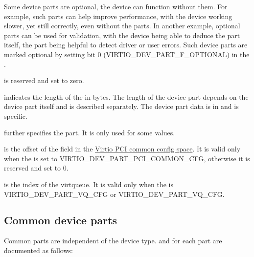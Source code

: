 Some device parts are optional, the device can function without them.
For example, such parts can help improve performance, with the device working
slower, yet still correctly, even without the parts. In another example,
optional parts can be used for validation, with the device being able to deduce
the part itself, the part being helpful to detect driver or user errors.
Such device parts are marked optional by setting bit 0
(VIRTIO_DEV_PART_F_OPTIONAL) in the .

 is reserved and set to zero.

 indicates the length of the  in bytes. The length
of the device part depends on the device part itself and is described separately.
The device part data is in  and is  specific.

 further specifies the part. It is only used for some
 values.

 is the offset of the
field in the \hyperref[sec:Virtio Transport Options / Virtio Over PCI Bus / PCI Device Layout / Common configuration structure layout]{Virtio PCI common config space}. It is valid only when the  is set to VIRTIO_DEV_PART_PCI_COMMON_CFG,
otherwise it is reserved and set to 0.

 is the index of the virtqueue. It is valid
only when the  is VIRTIO_DEV_PART_VQ_CFG or
VIRTIO_DEV_PART_VQ_CFG.

\subsection{Common device parts}\label{sec:Basic Facilities of a Virtio Device / Device parts / Common device parts}

Common parts are independent of the device type.
 and  for each part are documented as follows:

